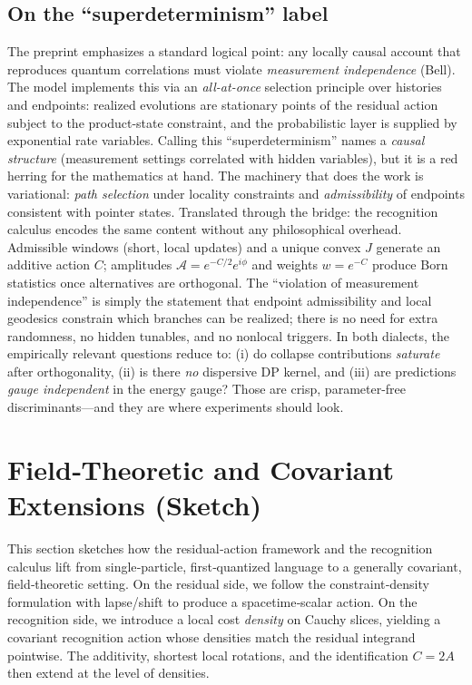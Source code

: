 \documentclass[11pt,letterpaper]{article}
\theoremstyle{definition}
\begin{document}
\subsection*{On the ``superdeterminism'' label}

The preprint emphasizes a standard logical point: any locally causal account that reproduces quantum correlations must violate \emph{measurement independence} (Bell). The model implements this via an \emph{all-at-once} selection principle over histories and endpoints: realized evolutions are stationary points of the residual action subject to the product-state constraint, and the probabilistic layer is supplied by exponential rate variables. Calling this ``superdeterminism'' names a \emph{causal structure} (measurement settings correlated with hidden variables), but it is a red herring for the mathematics at hand. The machinery that does the work is variational: \emph{path selection} under locality constraints and \emph{admissibility} of endpoints consistent with pointer states.
Translated through the bridge: the recognition calculus encodes the same content without any philosophical overhead. Admissible windows (short, local updates) and a unique convex $J$ generate an additive action $C$; amplitudes $\mathcal A=e^{-C/2}e^{i\phi}$ and weights $w=e^{-C}$ produce Born statistics once alternatives are orthogonal. The ``violation of measurement independence'' is simply the statement that endpoint admissibility and local geodesics constrain which branches can be realized; there is no need for extra randomness, no hidden tunables, and no nonlocal triggers. In both dialects, the empirically relevant questions reduce to: (i) do collapse contributions \emph{saturate} after orthogonality, (ii) is there \emph{no} dispersive DP kernel, and (iii) are predictions \emph{gauge independent} in the energy gauge? Those are crisp, parameter-free discriminants—and they are where experiments should look.
\section{Field‑Theoretic and Covariant Extensions (Sketch)}

This section sketches how the residual‑action framework and the recognition calculus lift from single‑particle, first‑quantized language to a generally covariant, field‑theoretic setting. On the residual side, we follow the constraint‑density formulation with lapse/shift to produce a spacetime‑scalar action. On the recognition side, we introduce a local cost \emph{density} on Cauchy slices, yielding a covariant recognition action whose densities match the residual integrand pointwise. The additivity, shortest local rotations, and the identification \(C=2A\) then extend at the level of densities.
\end{document}
